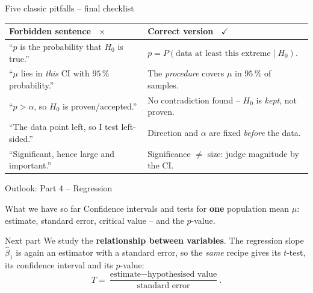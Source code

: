 \documentclass[aspectratio=169,11pt]{beamer}
\begin{document}
\begin{frame}{Five classic pitfalls -- final checklist}
  \small
  \begin{center}
    \renewcommand{\arraystretch}{1.45}
    \begin{tabular}{@{}>{\raggedright\arraybackslash}p{5.9cm}>{\raggedright\arraybackslash}p{6.7cm}@{}}
      \toprule
      \textbf{Forbidden sentence \ \textcolor{hsbirot}{$\times$}} &
      \textbf{Correct version \ \textcolor{green!55!black}{$\checkmark$}}\\
      \midrule
      ``$p$ is the probability that $H_0$ is true.'' &
        $p = P(\text{data at least this extreme} \mid H_0)$.\\
      ``$\mu$ lies in \emph{this} CI with $95\,\%$ probability.'' &
        The \emph{procedure} covers $\mu$ in $95\,\%$ of samples.\\
      ``$p > \alpha$, so $H_0$ is proven/accepted.'' &
        No contradiction found -- $H_0$ is \emph{kept}, not proven.\\
      ``The data point left, so I test left-sided.'' &
        Direction and $\alpha$ are fixed \emph{before} the data.\\
      ``Significant, hence large and important.'' &
        Significance $\neq$ size: judge magnitude by the CI.\\
      \bottomrule
    \end{tabular}
  \end{center}
\end{frame}

\begin{frame}{Outlook: Part 4 -- Regression}
  \begin{block}{What we have so far}
    Confidence intervals and tests for \textbf{one} population mean $\mu$:
    estimate, standard error, critical value -- and the $p$-value.
  \end{block}
  \begin{block}{Next part}
    We study the \textbf{relationship between variables}. The regression
    slope $\hat\beta_1$ is again an estimator with a standard error, so
    the \emph{same} recipe gives its $t$-test, its confidence interval and
    its $p$-value:
    \[
      T=\frac{\text{estimate}-\text{hypothesised value}}{\text{standard error}}.
    \]
  \end{block}
\end{frame}
\end{document}

